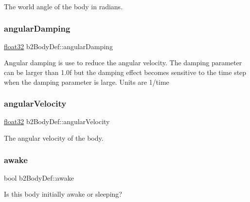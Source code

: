 The world angle of the body in radians. 

\mbox{\label{structb2_body_def_a01b8dc8ad9f0962efef9e4a8e836feb6}} 
\subsubsection{\texorpdfstring{angularDamping}{angularDamping}}
{\footnotesize\ttfamily \mbox{\hyperlink{b2_settings_8h_aacdc525d6f7bddb3ae95d5c311bd06a1}{float32}} b2\+Body\+Def\+::angular\+Damping}

Angular damping is use to reduce the angular velocity. The damping parameter can be larger than 1.\+0f but the damping effect becomes sensitive to the time step when the damping parameter is large. Units are 1/time \mbox{\label{structb2_body_def_add7809f7a29656b8c4b643ad8c2f34a9}} 
\subsubsection{\texorpdfstring{angularVelocity}{angularVelocity}}
{\footnotesize\ttfamily \mbox{\hyperlink{b2_settings_8h_aacdc525d6f7bddb3ae95d5c311bd06a1}{float32}} b2\+Body\+Def\+::angular\+Velocity}



The angular velocity of the body. 

\mbox{\label{structb2_body_def_a17a8102638aac41e7ab94278651a45bd}} 
\subsubsection{\texorpdfstring{awake}{awake}}
{\footnotesize\ttfamily bool b2\+Body\+Def\+::awake}



Is this body initially awake or sleeping? 

\mbox{\label{structb2_body_def_a7c0047c9a98a1d20614eeddcdbce7586}} 

